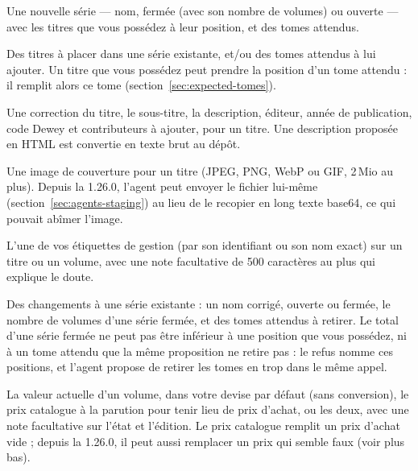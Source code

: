 \begin{description}[style=nextline]
  \item[\texttt{propose\_series\_create}] Une nouvelle série --- nom,
        fermée (avec son nombre de volumes) ou ouverte --- avec les
        titres que vous possédez à leur position, et des tomes
        attendus.
  \item[\texttt{propose\_series\_attach}] Des titres à placer dans une
        série existante, et/ou des tomes attendus à lui ajouter. Un
        titre que vous possédez peut prendre la position d'un tome
        attendu : il remplit alors ce tome
        (section~\ref{sec:expected-tomes}).
  \item[\texttt{propose\_title\_metadata}] Une correction du titre, le sous-titre, la description,
        éditeur, année de publication, code Dewey et contributeurs à
        ajouter, pour un titre. Une description proposée en HTML est
        convertie en texte brut au dépôt.
  \item[\texttt{propose\_cover}] Une image de couverture pour un titre
        (JPEG, PNG, WebP ou GIF, 2\,Mio au plus). Depuis la 1.26.0, l'agent
        peut envoyer le fichier lui-même (section~\ref{sec:agents-staging})
        au lieu de le recopier en long texte base64, ce qui pouvait abîmer
        l'image.
  \item[\texttt{propose\_label}] L'une de vos étiquettes de gestion
        (par son identifiant ou son nom exact) sur un titre ou un
        volume, avec une note facultative de 500 caractères au plus qui
        explique le doute.
  \item[\texttt{propose\_series\_update}] Des changements à une série
        existante : un nom corrigé, ouverte ou fermée, le nombre de
        volumes d'une série fermée, et des tomes attendus à retirer. Le
        total d'une série fermée ne peut pas être inférieur à une
        position que vous possédez, ni à un tome attendu que la même
        proposition ne retire pas : le refus nomme ces positions, et
        l'agent propose de retirer les tomes en trop dans le même
        appel.
  \item[\texttt{propose\_volume\_value}] La valeur actuelle d'un
        volume, dans votre devise par défaut (sans conversion), le prix
        catalogue à la parution pour tenir lieu de prix d'achat, ou les
        deux, avec une note facultative sur l'état et l'édition. Le prix
        catalogue remplit un prix d'achat vide ; depuis la 1.26.0, il peut
        aussi remplacer un prix qui semble faux (voir plus bas).
\end{description}


